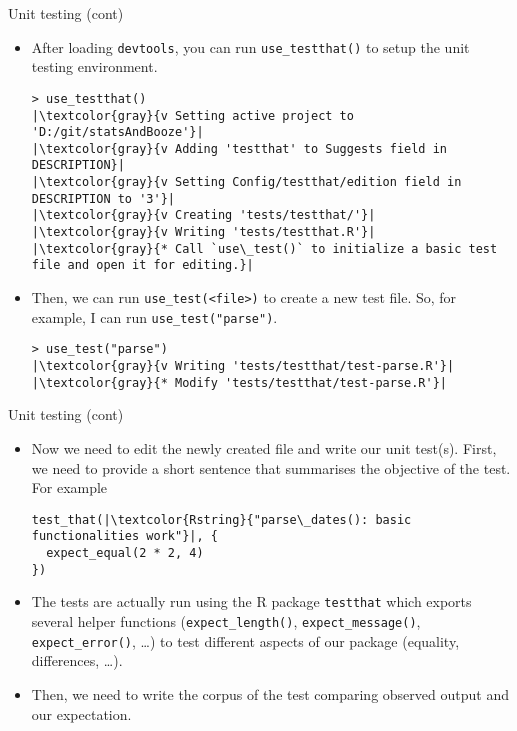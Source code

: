 \documentclass[
hyperref={bookmarks=false},
xcolor={dvipsnames,svgnames*,x11names*}, 
12pt
]{beamer}
\begin{document}
\begin{frame}[fragile]{Unit testing (cont)}
\vspace{-0.5cm}
\begin{itemize}
\itemsep 1ex
\item After loading \texttt{devtools}, you can run \texttt{use\_testthat()} to setup the unit testing environment. 
\begin{lstlisting}
> use_testthat()
|\textcolor{gray}{v Setting active project to 'D:/git/statsAndBooze'}|
|\textcolor{gray}{v Adding 'testthat' to Suggests field in DESCRIPTION}|
|\textcolor{gray}{v Setting Config/testthat/edition field in DESCRIPTION to '3'}|
|\textcolor{gray}{v Creating 'tests/testthat/'}|
|\textcolor{gray}{v Writing 'tests/testthat.R'}|
|\textcolor{gray}{* Call `use\_test()` to initialize a basic test file and open it for editing.}|
\end{lstlisting}
\item Then, we can run \texttt{use\_test(\textcolor{Rstring}{<file>})} to create a new test file. So, for example, I can run \texttt{use\_test(\textcolor{Rstring}{"parse"})}. 
\begin{lstlisting}
> use_test("parse")
|\textcolor{gray}{v Writing 'tests/testthat/test-parse.R'}|
|\textcolor{gray}{* Modify 'tests/testthat/test-parse.R'}|
\end{lstlisting}
\end{itemize}
\end{frame}

\begin{frame}[fragile]{Unit testing (cont)}
\vspace{-0.5cm}
\begin{itemize}
\itemsep 2ex
\item Now we need to edit the newly created file and write our unit test(s). First, we need to provide a short sentence that summarises the objective of the test. For example
\begin{lstlisting}
test_that(|\textcolor{Rstring}{"parse\_dates(): basic functionalities work"}|, {
  expect_equal(2 * 2, 4)
})
\end{lstlisting}
\item The tests are actually run using the R package \texttt{testthat} which exports several helper functions (\texttt{expect\_length()}, \texttt{expect\_message()}, \texttt{expect\_error()}, \dots) to test different aspects of our package (equality, differences, \dots).
\item Then, we need to write the corpus of the test comparing observed output and our expectation. 
\end{itemize}
\end{frame}
\end{document}
